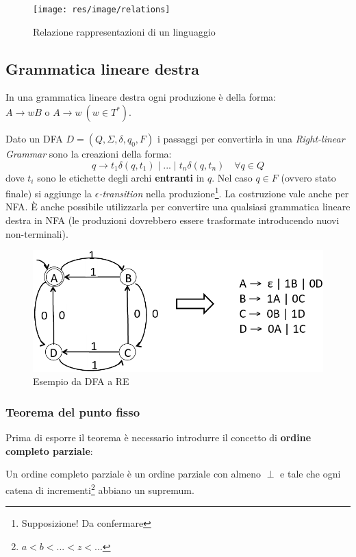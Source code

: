 \begin{figure}[H]
\begin{center}
\texttt{[image: res/image/relations]}
\end{center}
\caption{Relazione rappresentazioni di un linguaggio}
\label{img:relations}
\end{figure}

\subsection{Grammatica lineare destra}
\label{sec:grammatica_lineare_destra}
\begin{definition}
In una grammatica lineare destra ogni produzione \`e della forma:
$A \to wB \text{ o } A \to w \ (w \in T^*)$.
\end{definition}

Dato un DFA $D = (Q,\Sigma, \delta, q_0, F)$ i passaggi per convertirla in una
\textit{Right-linear Grammar} sono la creazioni della forma:
$$q \to t_1\delta(q,t_1) \mid ... \mid t_n\delta(q,t_n) \quad \forall q \in Q$$
dove $t_i$ sono le etichette degli archi \textbf{entranti} in $q$. Nel caso
$q \in F$ (ovvero stato finale) si aggiunge la $\epsilon$\textit{-transition}
nella produzione\footnote{Supposizione! Da confermare}. La costruzione vale
anche per NFA. \`E anche possibile utilizzarla per convertire una qualsiasi
grammatica lineare destra in NFA (le produzioni dovrebbero essere trasformate
introducendo nuovi non-terminali).

\begin{figure}[H]
\begin{center}
\includegraphics[scale=0.5]{res/image/from_dfa_to_re}
\end{center}
\caption{Esempio da DFA a RE}
\label{img:from_dfa_to_re}
\end{figure}

\subsubsection{Teorema del punto fisso}
\label{sec:theorem_fixed_point}
Prima di esporre il teorema \`e necessario introdurre il concetto di
\textbf{ordine completo parziale}:
\begin{definition}
Un ordine completo parziale \`e un ordine parziale con almeno $\perp$ e tale
che ogni catena di incrementi\footnote{$a < b < ... < z < ...$} abbiano un
supremum.
\end{definition}

